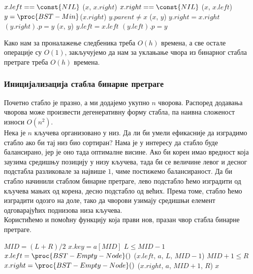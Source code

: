 \documentclass[11pt, a4paper]{article}
\theoremstyle{remark}
\numberwithin{equation}{section}
\begin{document}
	\begin{codebox}
		\li \If $x.left == \const{NIL}$
		\li \Do {}($x$, $x.right$)
		\End
		\li \Else \If $x.right==\const{NIL}$
		\li \Do {}($x$, $x.left$)
		\End
		\li \Else $y=\proc{BST-Min}$($x.right$)
		\li \Do \If $y.parent \neq x$
		\li \Do {}($x$, $y$)
		\li $y.right=x.right$
		\li $(y.right).p=y$
		\End
		\li {}($x$, $y$)
		\li $y.left=x.left$
		\li $(y.left).p=y$
		\End
	\end{codebox}

	\indent Како нам за проналажење следбеника треба $O(h)$ времена, а све остале операције су $O(1)$, закључујемо да нам за уклањање чвора из бинарног стабла претраге треба $O(h)$ времена.
	
	\subsubsection{Иницијализација стабла бинарне претраге}
	Почетно стабло је празно, а ми додајемо укупно $n$ чворова. Распоред додавања чворова може произвести дегенеративну форму стабла, па наивна сложеност износи $O(n^2)$. \\
	
	\indent Нека је $n$ кључева организовано у низ. Да ли би умели ефикасније да изградимо стабло ако би тај низ био сортиран? Нама је у интересу да стабло буде балансирано, јер је оно тада оптималне висине. Ако би корен имао вредност која заузима средишњу позицију у низу кључева, тада би се величине левог и десног подстабла разликовале за највише $1$, чиме постижемо балансираност. Да би стабло начинили стаблом бинарне претраге, лево подстабло ћемо изградити од кључева мањих од корена, десно подстабло од већих. Према томе, стабло ћемо изградити одозго на доле, тако да чворови узимају средишњи елемент одговарајућих поднизова низа кључева. \\
	\indent Користићемо и помоћну функцију  која прави нов, празан чвор стабла бинарне претраге. 
	
	\begin{codebox}
		\Procname{\proc{BST-Init}($x$, $a$, $L$, $R$)}
		\li $MID=(L+R)/2$
		\li $x.key=a[MID]$
		\li \If $L \leq MID-1$
		\li \Do $x.left=\proc{BST-Empty-Node}()$
		\li {}($x.left$, $a$, $L$, $MID-1$)
		\End
		\li \If $MID+1 \leq R$
		\li \Do $x.right=\proc{BST-Empty-Node}()$
		\li {}($x.right$, $a$, $MID+1$, $R$)
		\End
		\li \Return $x$
	\end{codebox}
	
\end{document}
